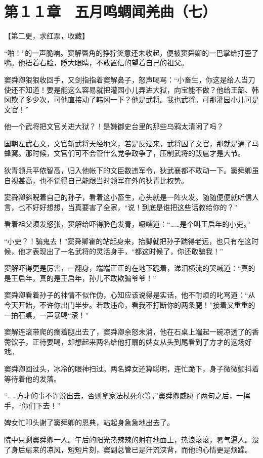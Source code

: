 \section{第１１章　五月鸣蜩闻羌曲（七）}

【第二更，求红票，收藏】

“啪！”的一声脆响。窦解唇角的狰狞笑意还未收起，便被窦舜卿的一巴掌给打歪了嘴。他捂着右脸，瞪大眼睛，不敢置信的望着自己的祖父。

窦舜卿狠狠收回手，又剑指指着窦解鼻子，怒声喝骂：“小畜生，你这是给人当刀使还不知道！要是能这么容易就把灌园小儿弄进大狱，向宝能不做？他给王韶、韩冈欺了多少次，可他直接动了韩冈一下？他是武将。我也武将。可那灌园小儿可是文官！”

他一个武将把文官关进大狱？！是嫌御史台里的那些乌鸦太清闲了吗？

国朝左武右文，文官斩武将天经地义，若是反过来，武将囚了文官，那就是通了马蜂窝。那时候，文官们可不会管什么党争政争了，压制武将的跋扈才是大节。

狄青领兵平侬智高，归入他帐下的文臣数违军令，狄武襄都不敢动一下。窦舜卿虽自视甚高，也不觉得自己能跟当时领军在外的狄青比权势。

窦舜卿斜睨着自己的孙子，看着这小畜生，心头就是一阵火发。随随便便就听信人言，也不好好想想，当真要害了全家，“说！到底是谁把这些话教给你的？”

看着祖父须发怒张，窦解给吓得脸色发青，嗫嚅道：“……是个叫王启年的小吏。”

“小吏？！骗鬼去！”窦舜卿霍的站起身来，抬脚就把孙子踹得老远，也只有在这时候，他才表现出了一名武将的灵活身手，“都这时候了，你还敢骗我！”

窦解吓得更是厉害，一翻身，端端正正的在地下跪着，涕泪横流的哭喊道：“真的是王启年，真的是王启年，孙儿不敢欺骗爷爷！”

窦舜卿看着孙子的神情不似作伪，心知应该说得是实话，他不耐烦的叱骂道：“从今天开始，不许你出门半步。若敢违命，看我不打断你的两条腿！”接着又重重的一拍石桌，一声暴喝“滚！”

窦解连滚带爬的瘸着腿出去了，窦舜卿余怒未消，他在石桌上端起一碗凉透了的香薷饮子，正待要喝，却想起来两名给他打扇的婢女从头到尾看到了方才的这场好戏。

窦舜卿回过头，冰冷的眼神扫过。两名婢女还算聪明，连忙跪下，身子微微颤抖着等待着他的发落。

“……方才的事不许说出去，否则拿家法杖死尔等。”窦舜卿威胁了两句之后，一挥手，“你们下去！”

婢女忙叩头谢了窦舜卿的恩典，站起身急急地出去了。

院中只剩窦舜卿一人。午后的阳光热辣辣的射在地面上，热浪滚滚，暑气逼人。没了身后扇来的凉风，短短片刻，窦副总管已是汗流浃背，而他的心情更是烦躁。

